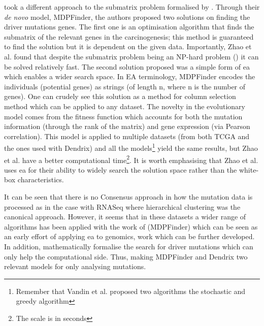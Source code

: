 \citet{Zhao2012-wj} took a different approach to the submatrix problem formalised by \citet{Vandin2012-cf}. Through their \textit{de novo} model, MDPFinder\cite{Zhao2012-wj}, the authors proposed two solutions on finding the driver mutations genes. The first one is an optimisation algorithm that finds the submatrix of the relevant genes in the carcinogenesis; this method is guaranteed to find the solution but it is dependent on the given data. Importantly, Zhao et al. found that despite the submatrix problem being an NP-hard problem (\citet{Vandin2012-cf}) it can be solved relatively fast. The second solution proposed was a simple form of \acrfull{ea} which enables a wider search space. In EA terminology, MDPFinder encodes the individuals (potential genes) as strings (of length n, where n is the number of genes). One can crudely see this solution as a method for column selection method which can be applied to any dataset. The novelty in the evolutionary model comes from the fitness function which accounts for both the mutation information (through the rank of the matrix) and gene expression (via Pearson correlation). This model is applied to multiple datasets (from both TCGA and the ones used with Dendrix\cite{Vandin2012-cf}) and all the models\footnote{Remember that Vandin et al. proposed two algorithms the stochastic and greedy algorithm} yield the same results, but Zhao et al. have a better computational time\footnote{The scale is in seconds}. It is worth emphasising that Zhao et al. uses \acrshort{ea} for their ability to widely search the solution space rather than the white-box characteristics.

It can be seen that there is no Consensus approach in how the mutation data is processed as in the case with RNASeq where hierarchical clustering was the canonical approach. However, it seems that in these datasets a wider range of algorithms has been applied with the work of \citet{Zhao2012-wj} (MDPFinder) which can be seen as an early effort of applying \acrshort{ea} to genomics, work which can be further developed. In addition, \citet{Vandin2012-cf} mathematically formalise the search for driver mutations which can only help the computational side. Thus, making MDPFinder and Dendrix two relevant models for only analysing mutations.



